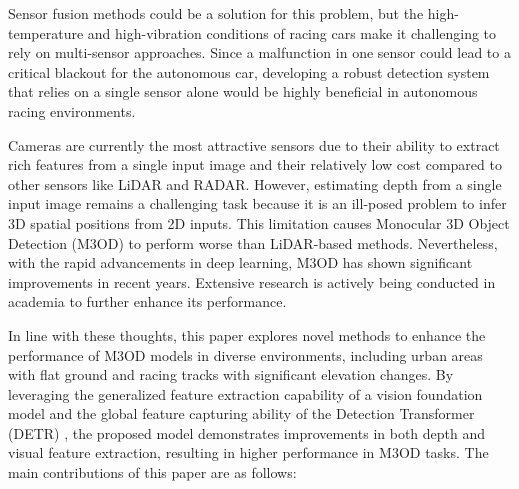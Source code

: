 Sensor fusion methods could be a solution for this problem, but the high-temperature and high-vibration conditions of racing cars make it challenging to rely on multi-sensor approaches. Since a malfunction in one sensor could lead to a critical blackout for the autonomous car, developing a robust detection system that relies on a single sensor alone would be highly beneficial in autonomous racing environments.

Cameras are currently the most attractive sensors due to their ability to extract rich features from a single input image and their relatively low cost compared to other sensors like LiDAR and RADAR. However, estimating depth from a single input image remains a challenging task because it is an ill-posed problem to infer 3D spatial positions from 2D inputs. This limitation causes Monocular 3D Object Detection (M3OD) to perform worse than LiDAR-based methods. Nevertheless, with the rapid advancements in deep learning, M3OD has shown significant improvements in recent years. Extensive research is actively being conducted in academia to further enhance its performance.

In line with these thoughts, this paper explores novel methods to enhance the performance of M3OD models in diverse environments, including urban areas with flat ground and racing tracks with significant elevation changes. By leveraging the generalized feature extraction capability of a vision foundation model and the global feature capturing ability of the Detection Transformer (DETR) \cite{carion2020end}, the proposed model demonstrates improvements in both depth and visual feature extraction, resulting in higher performance in M3OD tasks.
The main contributions of this paper are as follows:

